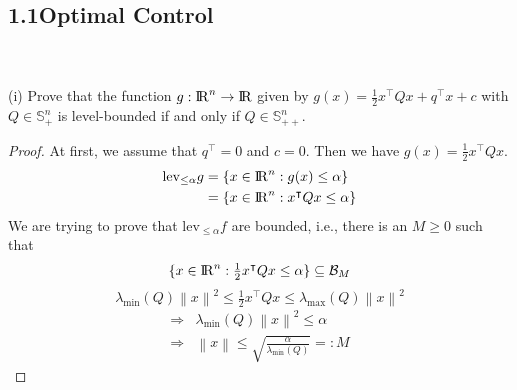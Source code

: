 \documentclass[a4paper,11pt,reqno]{amsart}
\newcommand{\R}{{\rm I\!R}}
\newcommand{\tran}{\intercal}
\begin{document}
\subsection*{1.1\quad Optimal Control}\label{sec:q1}
\
\\ \\
(i) Prove that the function $g:\R^n\to \R$ given by $g(x) = \frac{1}{2}x^{\tran}Qx+q^{\tran}x+c$ with $Q\in \mathbb{S}^n_+$ is level-bounded
if and only if $Q\in \mathbb{S}^n_{++}$.
\\ 
\begin{proof}
    At first, we assume that $q^{\tran}=0$ and $c=0$. Then we have $g(x)=\tfrac{1}{2}x^{\tran}Qx$.
\begin{align}
    \mathrm{lev}_{\leq \alpha}g&=\{x\in\R^n:g(x)\leq\alpha\}
    \\
    &=\{x\in\R^n:x^{\tran}Qx\leq\alpha\}
\end{align}
We are trying to prove that $\mathrm{lev}_{\leq \alpha}f$ are bounded, i.e., there is an $M\geq 0$ such that
\begin{equation}
    \{x\in\R^n:\tfrac{1}{2}x^{\tran}Qx\leq\alpha\}\subseteq \mathcal{B}_M
\end{equation}
\begin{equation}
    \lambda_{\mathrm{min}}(Q)\left\lVert x\right\rVert ^2\leq \tfrac{1}{2}x^{\tran}Qx\leq \lambda_{\mathrm{max}}(Q)\left\lVert x\right\rVert ^2
\end{equation}
\begin{align}
    \Longrightarrow &\lambda_{\mathrm{min}}(Q)\left\lVert x\right\rVert ^2\leq \alpha\\
    \Longrightarrow &\left\lVert x\right\rVert \leq \sqrt{\frac{\alpha}{\lambda_{\mathrm{min}}(Q)}}=:M
\end{align}


\end{proof}
\end{document}

